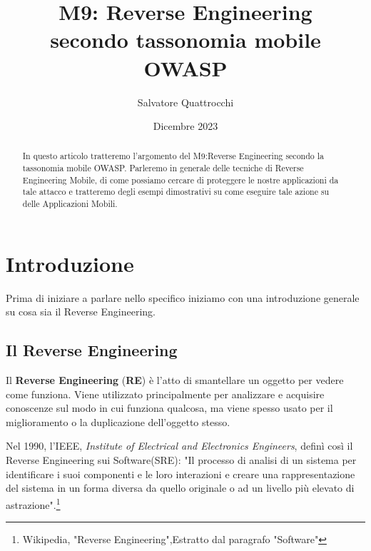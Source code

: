 \documentclass{article}
\begin{document}
\title{\textbf{\LARGE\Huge M9: Reverse Engineering} \\ secondo tassonomia mobile OWASP}
\author{Salvatore Quattrocchi}

\date{Dicembre 2023}

\maketitle

\begin{abstract}
    In questo articolo tratteremo l'argomento del M9:Reverse Engineering secondo la tassonomia mobile OWASP.
    Parleremo in generale delle tecniche di Reverse Engineering Mobile, di come possiamo cercare di proteggere le nostre 
    applicazioni da tale attacco e tratteremo degli esempi dimostrativi su come eseguire tale azione su delle Applicazioni Mobili.
\end{abstract}

\newpage
\tableofcontents
\newpage
\section{Introduzione}
Prima di iniziare a parlare nello specifico iniziamo con una introduzione generale su cosa sia il Reverse Engineering.

\subsection{Il Reverse Engineering}
Il \textbf{Reverse Engineering} (\textbf{RE}) è l'atto di smantellare un oggetto per vedere come funziona. 
Viene utilizzato principalmente per analizzare e acquisire conoscenze sul modo in cui funziona qualcosa, ma viene spesso usato per il miglioramento o la duplicazione dell'oggetto stesso.

Nel 1990, l'IEEE, \textit{Institute of Electrical and Electronics Engineers}, definì così il Reverse Engineering sui Software(SRE): "Il processo di analisi di un sistema per identificare i suoi componenti
e le loro interazioni e creare una rappresentazione del sistema in un forma diversa da quello originale o ad un livello più elevato di astrazione".\footnote{Wikipedia, "Reverse Engineering",Estratto dal paragrafo "Software"\cite{REWikipedia}}
\end{document}
